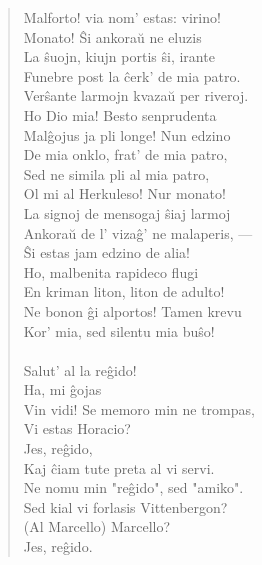 \begin{verse}
                Malforto! via nom' estas: virino!\\
                Monato! \^Si ankora\u u ne eluzis\\
                La \^suojn, kiujn portis \^si, irante\\
                Funebre post la \^cerk' de mia patro.\\
                Ver\^sante larmojn kvaza\u u per riveroj.\\
                Ho Dio mia! Besto senprudenta\\
                Mal\^gojus ja pli longe! Nun edzino\\
                De mia onklo, frat' de mia patro,\\
                Sed ne simila pli al mia patro,\\
                Ol mi al Herkuleso! Nur monato!\\
                La signoj de mensogaj \^siaj larmoj\\
                Ankora\u u de l' viza\^g' ne malaperis, ---\\
                \^Si estas jam edzino de alia!\\
                Ho, malbenita rapideco flugi\\
                En kriman liton, liton de adulto!\\
                Ne bonon \^gi alportos! Tamen krevu\\
                Kor' mia, sed silentu mia bu\^so!\\
\\
 Salut' al la re\^gido!\\
 Ha, mi \^gojas\\
                Vin vidi! Se memoro min ne trompas,\\
                Vi estas Horacio?\\
Jes, re\^gido,\\
                Kaj \^ciam tute preta al vi servi.\\
 Ne nomu min "re\^gido", sed "amiko".\\
                Sed kial vi forlasis Vittenbergon?\\
                {\footnotesize (Al Marcello)} Marcello?\\
 Jes, re\^gido.\\

\end{verse}

